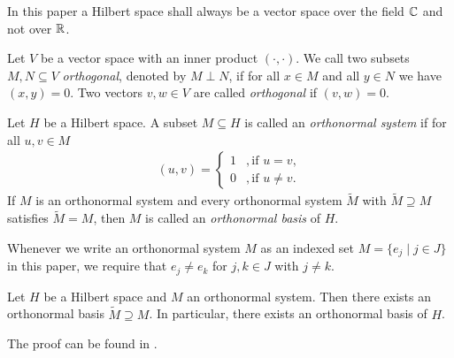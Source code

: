 In this paper a Hilbert space shall always be a vector space over the field $\mathbb{C}$ and not over $\mathbb{R}$. 

\begin{definition}
	Let $V$ be a vector space with an inner product $(\cdot, \cdot)$. We call two subsets $M,N \subseteq V$ \textit{orthogonal}, denoted by $M \perp N$, if for all $x \in M$ and all $y \in N$ we have $(x,y) = 0$. Two vectors $v,w \in V$ are called \textit{orthogonal} if $(v,w) = 0$. 
\end{definition}

\begin{definition}
	Let $H$ be a Hilbert space. A subset $M \subseteq H$ is called an \textit{orthonormal system} if for all $u,v \in M$
	\begin{align*}
		(u,v) = 
		\begin{cases}
			1 &, \text{if } u = v, \\
			0 &, \text{if } u \neq v.
		\end{cases}
	\end{align*}
	If $M$ is an orthonormal system and every orthonormal system $\tilde{M}$  with $\tilde{M} \supseteq M$ satisfies $\tilde{M} = M$, then $M$ is called an \textit{orthonormal basis} of $H$.
\end{definition}


\begin{remark}
	Whenever we write an orthonormal system $M$ as an indexed set $M = \{e_j \mid j \in J\}$ in this paper, we require that $e_j \neq e_k$ for $j,k \in J$ with $j \neq k$.
\end{remark}


\begin{lemma}\label{lemma:onb}
	Let $H$ be a Hilbert space and $M$ an orthonormal system. Then there exists an orthonormal basis $\tilde{M} \supseteq M$. In particular, there exists an orthonormal basis of $H$. 
\end{lemma}

The proof can be found in \cite[p.52]{FAna1}.


